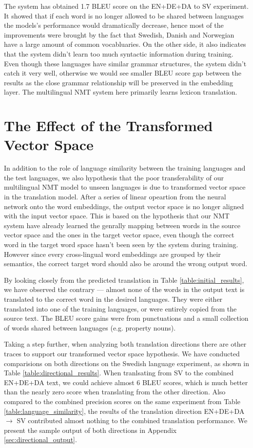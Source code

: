 \documentclass[thesis,fonts=libertine]{cluu}
\begin{document}
The system has obtained 1.7 BLEU score on the EN+DE+DA to SV experiment. It showed that if each word is no longer allowed to be shared between languages the models's performance would dramatically decrease, hence most of the improvements were brought by the fact that Swedish, Danish and Norwegian have a large amount of common vocabluaries. On the other side, it also indicates that the system didn't learn too much syntactic information during training. Even though these languages have similar grammar structures, the system didn't catch it very well, otherwise we would see smaller BLEU score gap between the results as the close grammar relationship will be preserved in the embedding layer. The multilingual NMT system here primarily learns lexicon translation.

\section{The Effect of the Transformed Vector Space}

In addition to the role of language similarity between the training languages and the test languages, we also hypothesis that the poor transferability of our multilingual NMT model to unseen languages is due to transformed vector space in the translation model. After a series of linear opeartion from the neural network onto the word embeddings, the output vector space is no longer aligned with the input vector space. This is based on the hypothesis that our NMT system have already learned the genrally mapping between words in the source vector space and the ones in the target vector space, even though the correct word in the target word space hasn't been seen by the system during training. However since every cross-lingual word embeddings are grouped by their semantics, the correct target word should also be around the wrong output word.

By looking closely from the predicted translation in Table \ref{table:initial_results}, we have observed the contrary --- almost none of the words in the output text is translated to the correct word in the desired languages. They were either translated into one of the training languages, or were entirely copied from the source text. The BLEU score gains were from punctuations and a small collection of words shared between languages (e.g. property nouns).

Taking a step further, when analyzing both translation directions there are other traces to support our transformed vector space hypothesis. We have conducted comparisions on both directions on the Swedish language experiment, as shown in Table \ref{table:directional_results}. When tranlsating from SV to the combined EN+DE+DA text, we could achieve almost 6 BLEU scores, which is much better than the nearly zero score when translating from the other direction. Also compared to the combined precision scores on the same experiment from Table \ref{table:language_similarity}, the results of the translation direction EN+DE+DA $\rightarrow$ SV contributed almost nothing to the combined translation performance.  We present the sample output of both directions in Appendix \ref{sec:directional_output}.
\end{document}
